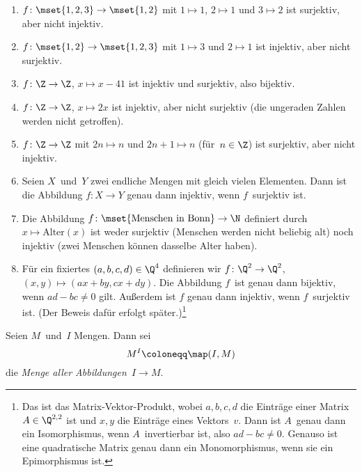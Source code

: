 \documentclass[a4paper]{article}
\begin{document}
\begin{example}\leavevmode
    \begin{enumerate}
        \item $f\colon \mset{1, 2, 3} \to \mset{1, 2}$ mit $1 \mapsto 1$, $2 \mapsto 1$ und $3 \mapsto 2$ ist surjektiv, aber nicht injektiv.
        \item $f\colon \mset{1, 2} \to \mset{1, 2, 3}$ mit $1 \mapsto 3$ und $2 \mapsto 1$ ist injektiv, aber nicht surjektiv.
        \item $f\colon \Z \to \Z$, $x \mapsto x-41$ ist injektiv und surjektiv, also bijektiv.
        \item $f\colon \Z \to \Z$, $x \mapsto 2x$ ist injektiv, aber nicht surjektiv (die ungeraden Zahlen werden nicht getroffen).
        \item $f\colon \Z \to \Z$ mit $2n \mapsto n$ und $2n+1 \mapsto n$ (für~$n \in \Z$) ist surjektiv, aber nicht injektiv.
        \item Seien $X$~und~$Y$ zwei endliche Mengen mit gleich vielen Elementen. Dann ist die Abbildung $f\colon X \to Y$ genau dann injektiv, wenn $f$~surjektiv ist.
        \item Die Abbildung $f\colon \mset{\text{Menschen in Bonn}} \to \N$ definiert durch $x \mapsto \text{Alter}(x)$ ist weder surjektiv (Menschen werden nicht beliebig alt) noch injektiv (zwei Menschen können dasselbe Alter haben).
        \item Für ein fixiertes $(a, b, c, d) \in \Q^4$ definieren wir $f\colon \Q^2 \to \Q^2$, $(x, y) \mapsto (ax+by, cx+dy)$. Die Abbildung $f$~ist genau dann bijektiv, wenn $ad-bc \neq 0$ gilt. Außerdem ist $f$ genau dann injektiv, wenn $f$~surjektiv ist. (Der Beweis dafür erfolgt später.)\footnote{Das ist das Matrix-Vektor-Produkt, wobei $a,b,c,d$ die Einträge einer Matrix~$A \in \Q^{2, 2}$ ist und $x,y$ die Einträge eines Vektors~$v$. Dann ist $A$~genau dann ein Isomorphismus, wenn $A$~invertierbar ist, also $ad-bc \neq 0$. Genauso ist eine quadratische Matrix genau dann ein Monomorphismus, wenn sie ein Epimorphismus ist.}
    \end{enumerate}
\end{example}


\begin{definition}
    Seien $M$~und~$I$ Mengen. Dann sei
    \begin{equation*}
        M^I \coloneqq \map(I, M)
    \end{equation*}
    die \emph{Menge aller Abbildungen~$I \to M$}.
\end{definition}
\end{document}
